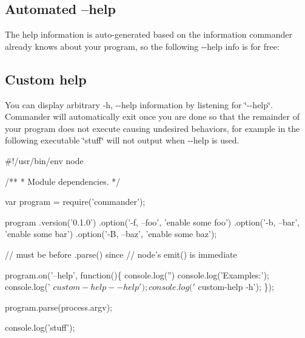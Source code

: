 \subsection*{Automated --help}

The help information is auto-\/generated based on the information commander already knows about your program, so the following {\ttfamily -\/-\/help} info is for free\+:




\subsection*{Custom help}

You can display arbitrary {\ttfamily -\/h, -\/-\/help} information by listening for \char`\"{}-\/-\/help\char`\"{}. Commander will automatically exit once you are done so that the remainder of your program does not execute causing undesired behaviors, for example in the following executable \char`\"{}stuff\char`\"{} will not output when {\ttfamily -\/-\/help} is used.


\begin{DoxyCode}
#!/usr/bin/env node

/**
 * Module dependencies.
 */

var program = require('commander');

program
  .version('0.1.0')
  .option('-f, --foo', 'enable some foo')
  .option('-b, --bar', 'enable some bar')
  .option('-B, --baz', 'enable some baz');

// must be before .parse() since
// node's emit() is immediate

program.on('--help', function()\{
  console.log('')
  console.log('Examples:');
  console.log('  $ custom-help --help');
  console.log('  $ custom-help -h');
\});

program.parse(process.argv);

console.log('stuff');
\end{DoxyCode}


